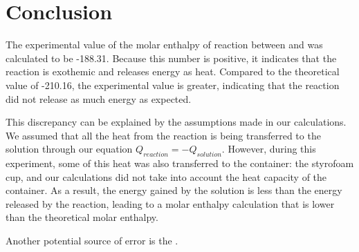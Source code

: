 \documentclass[demo, 12pt, notitlepage, letterpaper]{report}
\begin{document}
\section*{Conclusion}

The experimental value of the molar enthalpy of reaction between  and  was calculated to be -188.31\kjpmol . Because this number is positive, it indicates that the reaction is exothemic and releases energy as heat. Compared to the theoretical value of -210.16\kjpmol , the experimental value is greater, indicating that the reaction did not release as much energy as expected.

This discrepancy can be explained by the assumptions made in our calculations. We assumed that all the heat from the reaction is being transferred to the solution through our equation $Q_{reaction} = -Q_{solution}$. However, during this experiment, some of this heat was also transferred to the container: the styrofoam cup, and our calculations did not take into account the heat capacity of the container. As a result, the energy gained by the solution is less than the energy released by the reaction, leading to a molar enthalpy calculation that is lower than the theoretical molar enthalpy.

Another potential source of error is the . 
\end{document}
